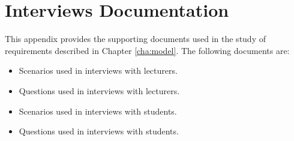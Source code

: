 \chapter{Interviews Documentation \label{cha:interviews}}

This appendix provides the supporting documents used in the study of \LLLs
requirements described in Chapter \ref{cha:model}. The following documents are:

\begin{itemize}
  \item Scenarios used in interviews with lecturers.
  \item Questions used in interviews with lecturers.
  \item Scenarios used in interviews with students.
  \item Questions used in interviews with students.
\end{itemize}









